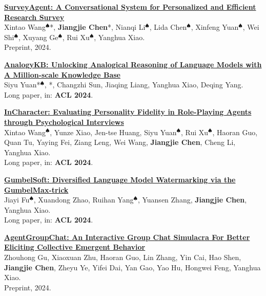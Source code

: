 \documentclass{resume}
\begin{document}
\begin{enumerate}[label={[\arabic*]}]
  \item \textbf{\href{https://survey-agent.github.io}{SurveyAgent: A Conversational System for Personalized and Efficient Research Survey}}\\
  \label{paper:surveyagent}
  Xintao Wang$^\spadesuit$*, \textbf{Jiangjie Chen}*, Nianqi Li$^\spadesuit$, Lida Chen$^\spadesuit$, Xinfeng Yuan$^\spadesuit$, Wei Shi$^\spadesuit$, Xuyang Ge$^\spadesuit$, Rui Xu$^\spadesuit$, Yanghua Xiao.\\
  Preprint, 2024.
  
  \item \textbf{\href{https://jiangjiechen.github.io/publication/analogykb/}{AnalogyKB: Unlocking Analogical Reasoning of Language Models with A Million-scale Knowledge Base}}\\
  \label{paper:analogykb}
  Siyu Yuan*$^\spadesuit$, \textbf{\color{black}{Jiangjie Chen}}*, Changzhi Sun, Jiaqing Liang, Yanghua Xiao, Deqing Yang.\\
  Long paper, in: \textbf{ACL 2024}.
  
  \item \textbf{\href{https://jiangjiechen.github.io/publication/incharacter}{InCharacter: Evaluating Personality Fidelity in Role-Playing Agents through Psychological Interviews}}\\
  \label{paper:incharacter}
  Xintao Wang$^\spadesuit$, Yunze Xiao, Jen-tse Huang, Siyu Yuan$^\spadesuit$, Rui Xu$^\spadesuit$, Haoran Guo, Quan Tu, Yaying Fei, Ziang Leng, Wei Wang, \textbf{Jiangjie Chen}, Cheng Li, Yanghua Xiao.\\
  Long paper, in: \textbf{ACL 2024}.
  
  \item \textbf{\href{https://jiangjiechen.github.io/publication/gumbelsoft}{GumbelSoft: Diversified Language Model Watermarking via the GumbelMax-trick}}\\
  \label{paper:gumbelsoft}
  Jiayi Fu$^\spadesuit$, Xuandong Zhao, Ruihan Yang$^\spadesuit$, Yuansen Zhang, \textbf{Jiangjie Chen}, Yanghua Xiao.\\
  Long paper, in: \textbf{ACL 2024}.

  \item \textbf{\href{https://arxiv.org/pdf/2403.13433}{AgentGroupChat: An Interactive Group Chat Simulacra For Better Eliciting Collective Emergent Behavior}}\\
  \label{paper:agentgroupchat}
  Zhouhong Gu, Xiaoxuan Zhu, Haoran Guo, Lin Zhang, Yin Cai, Hao Shen, \textbf{Jiangjie Chen}, Zheyu Ye, Yifei Dai, Yan Gao, Yao Hu, Hongwei Feng, Yanghua Xiao.\\
  Preprint, 2024.
  

\end{enumerate}
\end{document}
